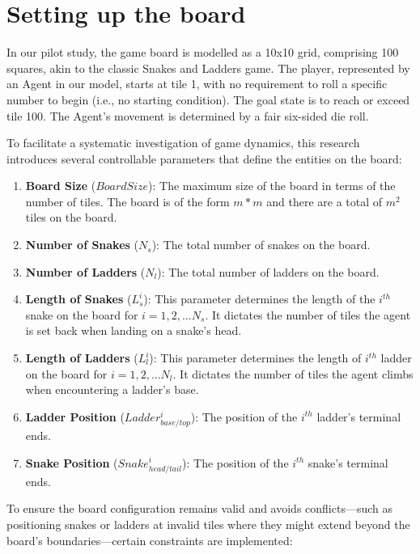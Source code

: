 \section{Setting up the board}

In our pilot study, the game board is modelled as a 10x10 grid, comprising 100 squares, akin to the classic Snakes and Ladders game. The player, represented by an Agent in our model, starts at tile 1, with no requirement to roll a specific number to begin (i.e., no starting condition). The goal state is to reach or exceed tile 100. The Agent's movement is determined by a fair six-sided die roll.

To facilitate a systematic investigation of game dynamics, this research introduces several controllable parameters that define the entities on the board:

\begin{enumerate}
	\item \textbf{Board Size }($BoardSize$): The maximum size of the board in terms of the number of tiles. The board is of the form $m * m$ and there are a total of $m^2$ tiles on the board.
	\item \textbf{Number of Snakes} ($N_{s}$): The total number of snakes on the board.
	\item \textbf{ Number of Ladders } ($N_{l}$): The total number of ladders on the board.
	\item \textbf{Length of Snakes }($L^{i}_{s}$): This parameter determines the length of the $i^{th}$ snake on the board for $i=1,2,... N_{s}$. It dictates the number of tiles the agent is set back when landing on a snake's head.
	\item \textbf{Length of Ladders} ($L^{i}_{l}$): This parameter determines the length of $i^{th}$ ladder on the board for $i=1,2,... N_{l}$. It dictates the number of tiles the agent climbs when encountering a ladder's base.
	\item \textbf{Ladder Position} ($Ladder^{i}_{base/top}$): The position of the $i^{th}$ ladder's terminal ends.
	\item \textbf{Snake Position} ($Snake^{i}_{head/tail}$): The position of the $i^{th}$ snake's terminal ends.
\end{enumerate}

To ensure the board configuration remains valid and avoids conflicts—such as positioning snakes or ladders at invalid tiles where they might extend beyond the board's boundaries—certain constraints are implemented:

